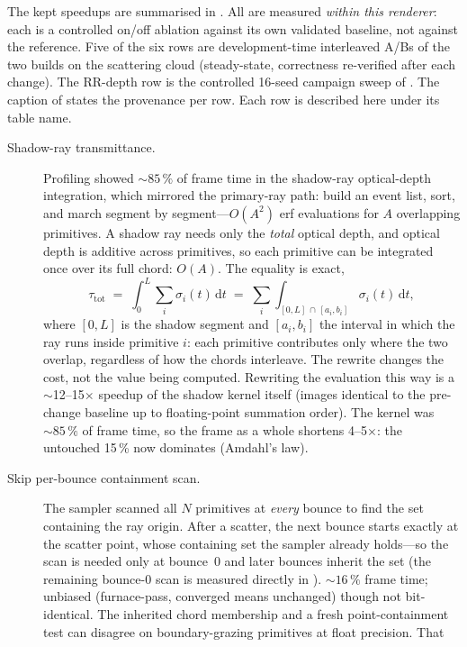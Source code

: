 The kept speedups are summarised in . All are measured \emph{within this renderer}:
each is a controlled on/off ablation against its own validated baseline, not against the
reference. Five of the six rows are development-time interleaved A/Bs of the two builds on
the scattering cloud (steady-state, correctness re-verified after
each change). The RR-depth row is the controlled \num{16}-seed campaign sweep of
. The caption of  states the provenance per row. Each row
is described here under its table name.
\begin{description}
  \item[Shadow-ray transmittance.] Profiling showed ${\sim}85\,\%$ of frame time in the shadow-ray
  optical-depth integration, which mirrored the primary-ray path: build an event list, sort, and
  march segment by segment---$O(A^2)$ erf evaluations for $A$ overlapping primitives. A shadow ray
  needs only the \emph{total} optical depth, and optical depth is additive across primitives, so each
  primitive can be integrated once over its full chord: $O(A)$. The equality is exact,
  \[
    \tau_{\mathrm{tot}} \;=\; \int_{0}^{L}\sum_i \sigma_i(t)\,\mathrm{d}t
    \;=\; \sum_i \int_{[0,L]\,\cap\,[a_i,b_i]} \sigma_i(t)\,\mathrm{d}t,
  \]
  where $[0,L]$ is the shadow segment and $[a_i,b_i]$ the interval in which the ray runs inside
  primitive $i$: each primitive contributes only where the two overlap, regardless of how the
  chords interleave. The rewrite changes the cost, not the value being computed. Rewriting the evaluation this way is
  a $\sim$\num{12}--\num{15}$\times$ speedup of the shadow kernel itself (images identical to the
  pre-change baseline up to floating-point summation order). The kernel was ${\sim}85\,\%$ of
  frame time, so the frame as a whole shortens \num{4}--\num{5}$\times$: the untouched
  \num{15}\,\% now dominates (Amdahl's law).
  \item[Skip per-bounce containment scan.] The sampler scanned all $N$ primitives at \emph{every}
  bounce to find the set containing the ray origin. After a scatter, the next bounce starts exactly
  at the scatter point, whose containing set the sampler already holds---so the scan is needed only
  at bounce~$0$ and later bounces inherit the set (the remaining bounce-$0$ scan is
measured directly in ). ${\sim}16\,\%$ frame time; unbiased (furnace-pass,
  converged means unchanged) though not bit-identical. The inherited chord membership and a fresh
  point-containment test can disagree on boundary-grazing primitives at float precision. That

\end{description}
